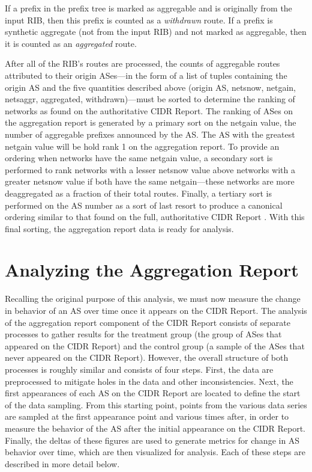 If a prefix in the prefix tree is marked as aggregable and is originally from the input RIB, then this prefix is counted as a \emph{withdrawn} route. If a prefix is synthetic aggregate (not from the input RIB) and not marked as aggregable, then it is counted as an \emph{aggregated} route.

After all of the RIB's routes are processed, the counts of aggregable routes attributed to their origin ASes---in the form of a list of tuples containing the origin AS and the five quantities described above (origin AS, netsnow, netgain, netsaggr, aggregated, withdrawn)---must be sorted to determine the ranking of networks as found on the authoritative CIDR Report. The ranking of ASes on the aggregation report is generated by a primary sort on the netgain value, the number of aggregable prefixes announced by the AS. The AS with the greatest netgain value will be hold rank 1 on the aggregation report. To provide an ordering when networks have the same netgain value, a secondary sort is performed to rank networks with a lesser netsnow value above networks with a greater netsnow value if both have the same netgain---these networks are more deaggregated as a fraction of their total routes. Finally, a tertiary sort is performed on the AS number as a sort of last resort to produce a canonical ordering similar to that found on the full, authoritative CIDR Report \cite{cidr-report-full}. With this final sorting, the aggregation report data is ready for analysis.

\section{Analyzing the Aggregation Report}

Recalling the original purpose of this analysis, we must now measure the change in behavior of an AS over time once it appears on the CIDR Report. The analysis of the aggregation report component of the CIDR Report consists of separate processes to gather results for the treatment group (the group of ASes that appeared on the CIDR Report) and the control group (a sample of the ASes that never appeared on the CIDR Report). However, the overall structure of both processes is roughly similar and consists of four steps. First, the data are preprocessed to mitigate holes in the data and other inconsistencies. Next, the first appearances of each AS on the CIDR Report are located to define the start of the data sampling. From this starting point, points from the various data series are sampled at the first appearance point and various times after, in order to measure the behavior of the AS after the initial appearance on the CIDR Report. Finally, the deltas of these figures are used to generate metrics for change in AS behavior over time, which are then visualized for analysis. Each of these steps are described in more detail below.

